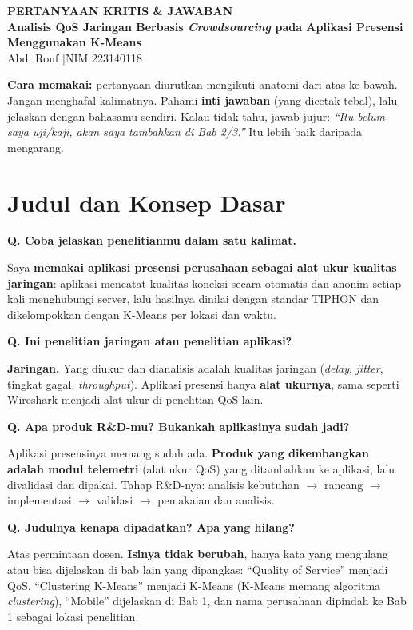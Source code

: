 \documentclass[11pt,a4paper]{article}
\newcounter{q}
\newcommand{\tanya}[2]{\stepcounter{q}%
\par\vspace{6pt}\noindent\colorbox{band}{\parbox{\dimexpr\linewidth-2\fboxsep}{\textbf{Q\arabic{q}. #1}}}\par\vspace{2pt}#2\par}
\begin{document}
\begin{center}
{\Large\bfseries\color{head} PERTANYAAN KRITIS \& JAWABAN}\\[4pt]
{\bfseries Analisis QoS Jaringan Berbasis \textit{Crowdsourcing} pada Aplikasi Presensi Menggunakan K-Means}\\[4pt]
Abd. Rouf \quad|\quad NIM 223140118
\end{center}

\textbf{Cara memakai:} pertanyaan diurutkan mengikuti anatomi dari atas ke bawah. Jangan menghafal kalimatnya. Pahami \textbf{inti jawaban} (yang dicetak tebal), lalu jelaskan dengan bahasamu sendiri. Kalau tidak tahu, jawab jujur: \textit{``Itu belum saya uji/kaji, akan saya tambahkan di Bab 2/3.''} Itu lebih baik daripada mengarang.

\section{Judul dan Konsep Dasar}

\tanya{Coba jelaskan penelitianmu dalam satu kalimat.}{Saya \textbf{memakai aplikasi presensi perusahaan sebagai alat ukur kualitas jaringan}: aplikasi mencatat kualitas koneksi secara otomatis dan anonim setiap kali menghubungi server, lalu hasilnya dinilai dengan standar TIPHON dan dikelompokkan dengan K-Means per lokasi dan waktu.}

\tanya{Ini penelitian jaringan atau penelitian aplikasi?}{\textbf{Jaringan.} Yang diukur dan dianalisis adalah kualitas jaringan (\textit{delay}, \textit{jitter}, tingkat gagal, \textit{throughput}). Aplikasi presensi hanya \textbf{alat ukurnya}, sama seperti Wireshark menjadi alat ukur di penelitian QoS lain.}

\tanya{Apa produk R\&D-mu? Bukankah aplikasinya sudah jadi?}{Aplikasi presensinya memang sudah ada. \textbf{Produk yang dikembangkan adalah modul telemetri} (alat ukur QoS) yang ditambahkan ke aplikasi, lalu divalidasi dan dipakai. Tahap R\&D-nya: analisis kebutuhan $\rightarrow$ rancang $\rightarrow$ implementasi $\rightarrow$ validasi $\rightarrow$ pemakaian dan analisis.}

\tanya{Judulnya kenapa dipadatkan? Apa yang hilang?}{Atas permintaan dosen. \textbf{Isinya tidak berubah}, hanya kata yang mengulang atau bisa dijelaskan di bab lain yang dipangkas: ``Quality of Service'' menjadi QoS, ``Clustering K-Means'' menjadi K-Means (K-Means memang algoritma \textit{clustering}), ``Mobile'' dijelaskan di Bab 1, dan nama perusahaan dipindah ke Bab 1 sebagai lokasi penelitian.}
\end{document}
